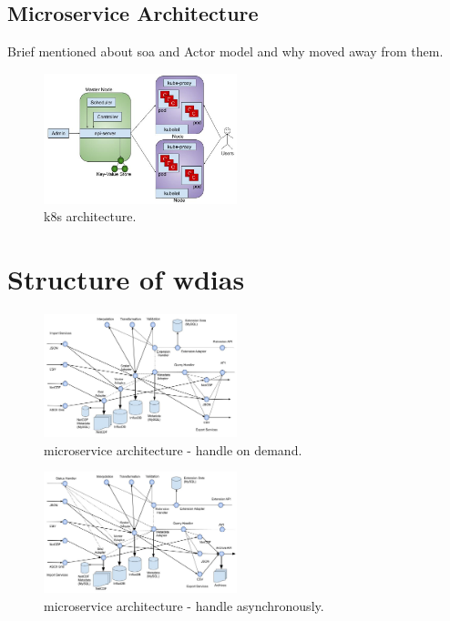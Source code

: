 \documentclass[conference]{IEEEtran}
\begin{document}
\subsection{Microservice Architecture}
Brief mentioned about soa and Actor model and why moved away from them.
\begin{figure}[htbp]
\centerline{\includegraphics[width=0.5\textwidth]{method/microservice/k8s_architecture_v3.jpg}}
\caption{\acrfull{k8s} architecture.}
\label{fi:k8s_architecture}
\end{figure}

\section{Structure of \acrshort{wdias}}
\begin{figure}[htbp]
\centerline{\includegraphics[width=0.5\textwidth]{method/microservice/microservice_architecture-handle_on_demand-v3.jpg}}
\caption{microservice architecture - handle on demand.}
\label{fi:microservice_architecture_on_demand}
\end{figure}

\begin{figure}[htbp]
\centerline{\includegraphics[width=0.5\textwidth]{method/microservice/microservice_architecture-handle_on_async-v3.jpg}}
\caption{microservice architecture - handle asynchronously.}
\label{fi:microservice_architecture_async}
\end{figure}
\end{document}
